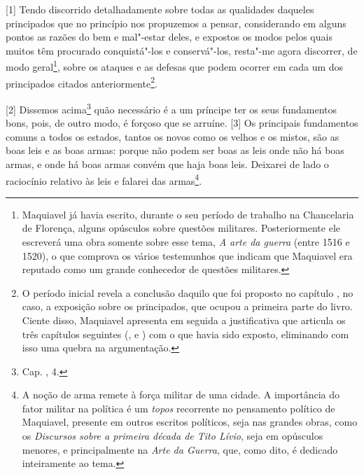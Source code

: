 {[}1{]} Tendo discorrido detalhadamente sobre todas as qualidades
daqueles principados que no princípio nos propuzemos a pensar,
considerando em alguns pontos as razões do bem e mal"-estar deles, e
expostos os modos pelos quais muitos têm procurado conquistá"-los e
conservá"-los, resta"-me agora discorrer, de modo geral\footnote{Maquiavel
  já havia escrito, durante o seu período de trabalho na Chancelaria de
  Florença, alguns opúsculos sobre questões militares. Posteriormente
  ele escreverá uma obra somente sobre esse tema, \emph{A arte da
  guerra} (entre 1516 e 1520), o que comprova os vários testemunhos que
  indicam que Maquiavel era reputado como um grande conhecedor de
  questões militares.}, sobre os ataques e as defesas que podem ocorrer
em cada um dos principados citados anteriormente\footnote{O período
  inicial revela a conclusão daquilo que foi proposto no capítulo , no
  caso, a exposição sobre os principados, que ocupou a primeira parte do
  livro. Ciente disso, Maquiavel apresenta em seguida a justificativa
  que articula os três capítulos seguintes (,  e ) com o que
  havia sido exposto, eliminando com isso uma quebra na argumentação.}.

{[}2{]} Dissemos acima\footnote{Cap. , 4.} quão necessário é a um
príncipe ter os seus fundamentos bons, pois, de outro modo, é forçoso
que se arruíne. {[}3{]} Os principais fundamentos comuns a todos os
estados, tantos os novos como os velhos e os mistos, são as boas leis e
as boas armas: porque não podem ser boas as leis onde não há boas armas,
e onde há boas armas convém que haja boas leis. Deixarei de lado o
raciocínio relativo às leis e falarei das armas\footnote{A noção de arma
  remete à força militar de uma cidade. A importância do fator militar
  na política é um \emph{topos} recorrente no pensamento político de
  Maquiavel, presente em outros escritos políticos, seja nas grandes
  obras, como os \emph{Discursos sobre a primeira década de Tito Lívio},
  seja em opúsculos menores, e principalmente na \emph{Arte da Guerra},
  que, como dito, é dedicado inteiramente ao tema.}.

